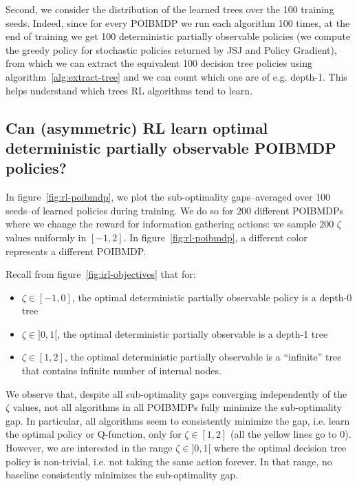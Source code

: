 Second, we consider the distribution of the learned trees over the 100 training seeds.
Indeed, since for every POIBMDP we run each algorithm 100 times, at the end of training we get 100 deterministic partially observable policies (we compute the greedy policy for stochastic policies returned by JSJ and Policy Gradient), from which we can extract the equivalent 100 decision tree policies using algorithm~\ref{alg:extract-tree} and we can count which one are of e.g. depth-1.
This helps understand which trees RL algorithms tend to learn.

\subsection{Can (asymmetric) RL learn optimal deterministic partially observable POIBMDP policies?}

In figure~\ref{fig:rl-poibmdp}, we plot the sub-optimality gaps--averaged over 100 seeds--of learned policies during training.
We do so for 200 different POIBMDPs where we change the reward for information gathering actions: we sample 200 $\zeta$ values uniformly in $[-1, 2]$.
In figure~\ref{fig:rl-poibmdp}, a different color represents a different POIBMDP.

Recall from figure~\ref{fig:irl-objectives} that for:
\begin{itemize}
    \item $\zeta\in [-1, 0]$, the optimal deterministic partially observable policy is a depth-0 tree
    \item $\zeta\in ]0, 1[$, the optimal deterministic partially observable is a depth-1 tree
    \item $\zeta\in [1, 2]$, the optimal deterministic partially observable is a ``infinite'' tree that contains infinite number of internal nodes.
\end{itemize}
We observe that, despite all sub-optimality gaps converging independently of the $\zeta$ values, not all algorithms in all POIBMDPs fully minimize the sub-optimality gap.
In particular, all algorithms seem to consistently minimize the gap, i.e. learn the optimal policy or Q-function, only for $\zeta \in [1, 2]$ (all the yellow lines go to 0).
However, we are interested in the range $\zeta\in ]0, 1[$ where the optimal decision tree policy is non-trivial, i.e. not taking the same action forever.
In that range, no baseline consistently minimizes the sub-optimality gap.


